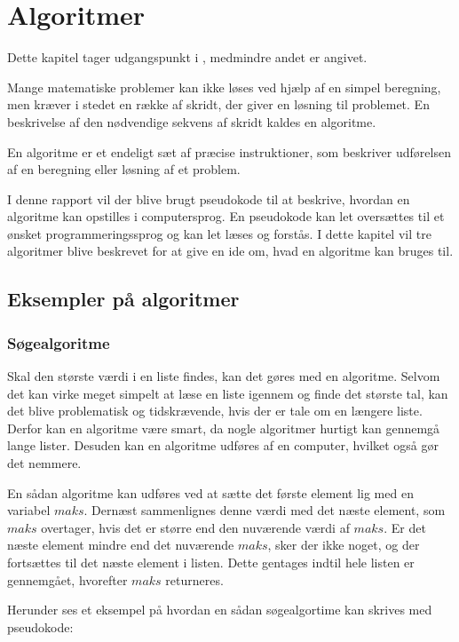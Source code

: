 \chapter{Algoritmer}
Dette kapitel tager udgangspunkt i \citep{dmat}, medmindre andet er angivet.

Mange matematiske problemer kan ikke løses ved hjælp af en simpel beregning, men kræver i stedet en række af skridt, der giver en løsning til problemet. 
En beskrivelse af den nødvendige sekvens af skridt kaldes en algoritme. 


\begin{defn}
En algoritme er et endeligt sæt af præcise instruktioner, som beskriver udførelsen af en beregning eller løsning af et problem.
\end{defn}

I denne rapport vil der blive brugt pseudokode til at beskrive, hvordan en algoritme kan opstilles i computersprog. 
En pseudokode kan let oversættes til et ønsket programmeringssprog og kan let læses og forstås. 
I dette kapitel vil tre algoritmer blive beskrevet for at give en ide om, hvad en algoritme kan bruges til. 

\section{Eksempler på algoritmer}
\subsection{Søgealgoritme}
Skal den største værdi i en liste findes, kan det gøres med en algoritme. 
Selvom det kan virke meget simpelt at læse en liste igennem og finde det største tal, kan det blive problematisk og tidskrævende, hvis der er tale om en længere liste. 
Derfor kan en algoritme være smart, da nogle algoritmer hurtigt kan gennemgå lange lister. 
Desuden kan en algoritme udføres af en computer, hvilket også gør det nemmere. 

En sådan algoritme kan udføres ved at sætte det første element lig med en variabel $maks$. 
Dernæst sammenlignes denne værdi med det næste element, som  $maks$ overtager, hvis det er større end den nuværende værdi af $maks$. 
Er det næste element mindre end det nuværende $maks$, sker der ikke noget, og der fortsættes til det næste element i listen. 
Dette gentages indtil hele listen er gennemgået, hvorefter $maks$ returneres.

Herunder ses et eksempel på hvordan en sådan søgealgortime kan skrives med pseudokode:


